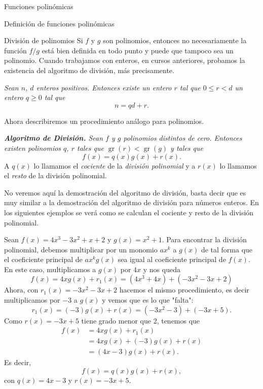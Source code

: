 \begin{chapter}{Funciones polinómicas}
\begin{section}{Definición de funciones polinómicas}
 \end{section}


 \begin{section}{División de polinomios}\label{seccion-division-de-polinomios} Si $f$ y $g$ son polinomios,  entonces no necesariamente la función $f/g$ está bien definida en todo punto y puede que tampoco sea un polinomio. Cuando trabajamos con enteros, en cursos anteriores,  probamos la existencia del algoritmo de división, más precisamente.

  \textit{Sean $n$, $d$ enteros positivos. Entonces existe un entero $r$ tal que
      $0 \le  r <d$  un entero $q \ge 0$ tal que
  }
  \begin{equation*}
      n = qd + r.
  \end{equation*}

  Ahora describiremos un procedimiento análogo para polinomios.

  \textit{\textbf{Algoritmo de División.} Sean $f$ y $g$ polinomios distintos de cero. Entonces existen polinomios $q$, $r$ tales que $\operatorname{gr}(r) < \operatorname{gr}(g)$ y tales que}
  \begin{equation*}
      f (x) = q (x) g (x) + r (x).
  \end{equation*}
  A $q(x)$ lo llamamos el \textit{cociente} de la \textit{división polinomial} y  a $r(x)$ lo llamamos el \textit{resto}  de la división polinomial.

  No veremos aquí la demostración del algoritmo de división, basta decir que es muy similar a  la demostración del algoritmo de división para números enteros. En los siguientes ejemplos se verá como se calculan el cociente y resto de la división polinomial.

  \begin{ejemplo*} Sean $f(x) = 4x^3 - 3x^2 + x + 2$ y $g(x) = x^2 + 1$. Para encontrar la división polinomial, debemos multiplicar por un monomio $ax^k$ a $g(x)$ de tal forma que el coeficiente principal de  $ax^kg(x)$ sea igual al coeficiente principal de $f(x)$. En este caso, multiplicamos a $g(x)$ por $4x$ y nos queda
      \begin{equation*}
          f(x) = 4xg(x) + r_1(x) = (4x^3 +4x)+(-3x^2-3x +2)
      \end{equation*}
      Ahora,  con $r_1(x)=-3x^2-3x +2$ hacemos el mismo procedimiento,  es decir multiplicamos por $-3$  a $g(x)$ y vemos que es lo que "falta":
      \begin{equation*}
          r_1(x) = (-3)g(x) +r(x) = (-3x^2 -3) + (-3x+5).
      \end{equation*}
      Como $r(x) = -3x+5$ tiene grado menor que 2, tenemos que
      \begin{align*}
          f(x) & = 4xg(x) + r_1(x) \\ &=4xg(x) + (-3)g(x) +r(x)\\& = (4x-3)g(x)+r(x).
      \end{align*}
      Es decir,
      \begin{equation*}
          f(x) = q(x)g(x)+r(x),
      \end{equation*}
      con $q(x) =4x-3$ y $r(x) = -3x+5$.


\end{ejemplo*}
\end{section}
\end{chapter}
